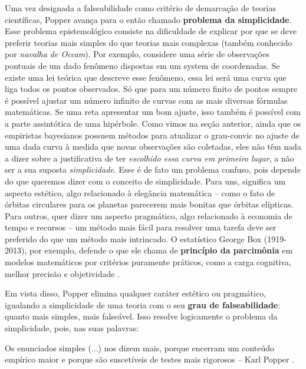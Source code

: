 \documentclass[./main.tex]{subfiles}
\begin{document}
\par Uma vez designada a \gls{falseabilidade} como critério de demarcação de teorias científicas, Popper avança para o então chamado \textbf{problema da simplicidade}. Esse problema epistemológico consiste na dificuldade de explicar por que se deve preferir teorias mais simples do que teorias mais complexas (também conhecido por \textit{navalha de Occam}). Por exemplo, considere uma série de observações pontuais de um dado fenômeno dispostas em um \gls{system} de coordenadas. Se existe uma lei teórica que descreve esse fenômeno, essa lei será uma curva que liga todos os pontos observados. Só que para um número finito de pontos sempre é possível ajustar um número infinito de curvas com as mais diversas fórmulas matemáticas. Se uma reta apresentar um bom ajuste, isso também é possível com a parte assintótica de uma hipérbole. Como vimos na seção anterior, ainda que os empiristas bayesianos possuem métodos para atualizar o \gls{grau-convic} no ajuste de uma dada curva à medida que novas observações são coletadas, eles não têm nada a dizer sobre a justificativa de ter \textit{escolhido essa curva em primeiro lugar}, a não ser a sua suposta \textit{simplicidade}. Esse é de fato um problema confuso, pois depende do que queremos dizer com o conceito de simplicidade. Para uns, significa um aspecto estético, algo relacionado à elegância matemática – como o fato de órbitas circulares para os planetas parecerem mais bonitas que órbitas elípticas. Para outros, quer dizer um aspecto pragmático, algo relacionado à economia de tempo e recursos – um método mais fácil para resolver uma tarefa deve ser preferido do que um método mais intrincado. O estatístico George Box (1919-2013), por exemplo, defende o que ele chama de \textbf{princípio da parcimônia} em modelos matemáticos por critérios puramente práticos, como a carga cognitiva, melhor precisão e objetividade \cite{Box1979}.

\par Em vista disso, Popper elimina qualquer caráter estético ou pragmático, igualando a simplicidade de uma \gls{teoria} com o seu \textbf{grau de falseabilidade}: quanto mais simples, mais falseável. Isso resolve logicamente o problema da simplicidade, pois, nas suas palavras:

\begin{adjustwidth}{100pt}{0pt}
\medskip
\small Os enunciados simples (...) nos dizem mais, porque encerram um conteúdo empírico maior e porque são suscetíveis de testes mais rigorosos -- Karl Popper \cite{popper2004logica}.
\medskip
\end{adjustwidth}
\end{document}
